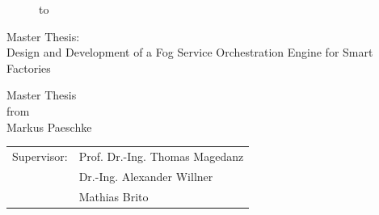 \begin{titlepage}
\begin{figure}
  \begin{center}
    \hbox to 
  \end{center}
\end{figure}

\begin{center}
\rule{0pt}{0pt}
\vfill
\vfill
\vfill
\vfill

\begin{huge}
Master Thesis:\\[0.75ex]
Design and Development of a Fog Service Orchestration Engine for Smart Factories\\[0.75ex]
\end{huge}

\vfill
\vfill

Master Thesis\\ from\\

\vspace*{.5cm}
Markus Paeschke\\

\vfill
\vfill
\vfill
\vfill

\begin{tabular}{rl}
Supervisor: & Prof. Dr.-Ing. Thomas Magedanz\\
& Dr.-Ing. Alexander Willner\\
& Mathias Brito
\end{tabular}
\end{center}
\end{titlepage}
